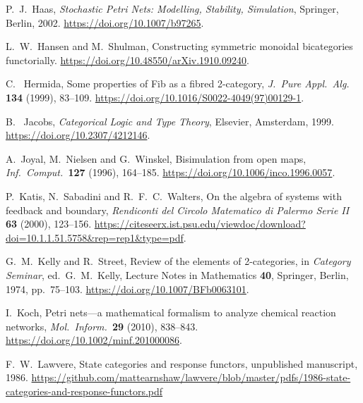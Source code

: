 \documentclass[ a4paper, onecolumn, superscriptaddress,10pt, accepted=2022-02-14, issue=3, volume=4, shorttitle=papers/compositionality-4-3 ]{compositionalityarticle}
\begin{document}
\begin{thebibliography}{100}
 P.\ J.\ Haas, \textsl{Stochastic Petri Nets: Modelling, Stability, Simulation},
Springer, Berlin, 2002. \href{https://doi.org/10.1007/b97265}{https://doi.org/10.1007/b97265}.

  L.\ W.\ Hansen and M.\ Shulman, Constructing symmetric monoidal bicategories
functorially. \href{https://doi.org/10.48550/arXiv.1910.09240}{https://doi.org/10.48550/arXiv.1910.09240}.

 C. \ Hermida, Some properties of Fib as a fibred 2-category, \textsl{J.\ Pure Appl.\ Alg.\ } \textbf{134} (1999), 83--109.
\href{https://doi.org/10.1016/S0022-4049(97)00129-1}{https://doi.org/10.1016/S0022-4049(97)00129-1}.

 B. \ Jacobs, \textsl{Categorical Logic and Type Theory}, Elsevier, Amsterdam, 1999.
\href{https://doi.org/10.2307/421214}{https://doi.org/10.2307/4212146}.

 A.\ Joyal, M.\ Nielsen and G.\ Winskel, Bisimulation from open maps, \textsl{Inf.\ Comput.\ }\textbf{127} (1996), 164--185.
\href{https://doi.org/10.1006/inco.1996.0057}{https://doi.org/10.1006/inco.1996.0057}.

 P.\ Katis, N.\ Sabadini and R.\ F.\ C.\ Walters, On the algebra of systems with feedback and boundary, \textsl{Rendiconti del Circolo
Matematico di Palermo Serie II} \textbf{63} (2000), 123--156.
\href{https://citeseerx.ist.psu.edu/viewdoc/download?doi=10.1.1.51.5758&rep=rep1&type=pdf}{
https://citeseerx.ist.psu.edu/viewdoc/download?doi=10.1.1.51.5758\&rep=rep1\&type=pdf}.

 G.\ M.\ Kelly and R.\ Street, Review of the elements of 2-categories, in \textsl{Category Seminar}, ed.\ G.\ M.\ Kelly, Lecture Notes in
Mathematics \textbf{40}, Springer, Berlin, 1974, pp.\ 75--103. \href{https://doi.org/10.1007/BFb0063101}{https://doi.org/10.1007/BFb0063101}.

 I.\ Koch, Petri nets---a mathematical formalism to analyze chemical reaction
networks, \textsl{Mol.\ Inform.\  }\textbf{29} (2010), 838--843.
\href{https://doi.org/10.1002/minf.201000086}{https://doi.org/10.1002/minf.201000086}.

 F.\ W.\ Lawvere, State categories and response functors, unpublished manuscript, 1986.
\href{https://github.com/mattearnshaw/lawvere/blob/master/pdfs/1986-state-categories-and-response-functors.pdf}{
https://github.com/mattearnshaw/lawvere/blob/master/pdfs/1986-state-categories-and-response-functors.pdf}


\end{thebibliography}
\end{document}
